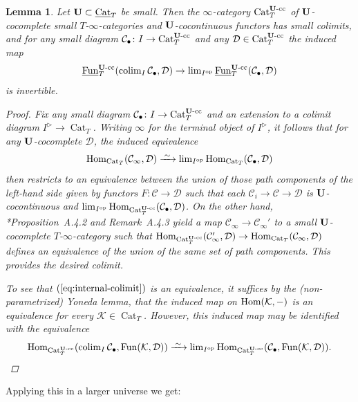 \documentclass[reqno]{memo-l}
\theoremstyle{mythm}
\newtheorem{lemma}[thm]{Lemma}
\theoremstyle{definition}
\numberwithin{equation}{section}
\newcommand{\Cc}{{\mathcal{C}}}
\newcommand{\Dd}{{\mathcal{D}}}
\newcommand{\Kk}{{\mathcal{K}}}
\DeclareMathOperator{\Cat}{Cat}
\renewcommand{\hom}{\textup{hom}}
\newcommand{\Fun}{{\textup{Fun}}}
\newcommand{\cat}[1]{\textbf{\textup{#1}}}
\newcommand{\op}{{\textup{op}}}
\renewcommand{\hom}{{\textup{Hom}}}
\newcommand{\colim}{\mathop{\textup{colim}}}
\newcommand{\ulhelper}[2]{\underline{\setbox0=\hbox{$#1#2$}\dp0=0.4pt \box0\relax}}
\newcommand{\ul}[1]{{\mathpalette\ulhelper{#1}}\hbox{\rule[-2pt]{0pt}{0pt}}}
\newcommand{\iso}{\xrightarrow{\;\smash{\raisebox{-0.25ex}{\ensuremath{\scriptstyle\sim}}}\;}}
\begin{document}
\begin{lemma}\label{lemma:small-class-of-colimits-cc}
    Let $\cat{U}\subset\ul\Cat_T$ be small. Then the $\infty$-category $\Cat_T^\textup{$\cat{U}$-cc}$ of $\cat{U}$-cocomplete small $T$-$\infty$-categories and $\cat{U}$-cocontinuous functors has small colimits, and for any small diagram $\Cc_\bullet\colon I\to\Cat_T^\textup{$\cat{U}$-cc}$ and any $\Dd\in\Cat_T^\textup{$\cat{U}$-cc}$ the induced map
    \begin{equation}\label{eq:internal-colimit}
        \ul\Fun_T^\textup{$\cat{U}$-cc}(\colim\nolimits_I \Cc_\bullet,\Dd)\to\lim\nolimits_{I^\op}\ul\Fun_T^\textup{$\cat{U}$-cc}(\Cc_\bullet,\Dd)
    \end{equation}
    is invertible.
    \begin{proof}
        Fix any small diagram $\Cc_\bullet\colon I\to\Cat_T^\textup{$\cat{U}$-cc}$ and an extension to a colimit diagram $I^\triangleright\to\Cat_T$. Writing $\infty$ for the terminal object of $I^\triangleright$, it follows that for any $\cat{U}$-cocomplete $\Dd$, the induced equivalence
        \[
            \hom_{\Cat_T}(\Cc_\infty,\Dd)\iso\lim\nolimits_{I^\op}\hom_{\Cat_T}(\Cc_\bullet,\Dd)
        \]
        then restricts to an equivalence between the union of those path components of the left-hand side given by functors $F\colon\Cc\to\Dd$ such that each $\Cc_i\to\Cc\to\Dd$ is $\cat{U}$-cocontinuous and $\lim_{I^\op}\hom_{\Cat_T^\textup{$\cat{U}$-cc}}(\Cc_\bullet,\Dd)$. On the other hand, \cite{martiniwolf2022presentable}*{Proposition~A.4.2 and Remark~A.4.3} yield a map $\Cc_\infty\to\Cc_\infty'$ to a small $\cat{U}$-cocomplete $T$-$\infty$-category such that $\hom_{\Cat_T^\textup{$\cat{U}$-cc}}(\Cc_\infty',\Dd)\to\hom_{\Cat_T}(\Cc_\infty,\Dd)$ defines an equivalence of the union of the same set of path components. This provides the desired colimit.
        
        To see that $(\ref{eq:internal-colimit})$ is an equivalence, it suffices by the (non-parametrized) Yoneda lemma, that the induced map on $\hom(\Kk,-)$ is an equivalence for every $\Kk\in\Cat_T$. However, this induced map may be identified with the equivalence
        \[
            \hom_{\Cat_T^\text{$\cat{U}$-cc}}(\colim\nolimits_I\Cc_\bullet,\Fun(\Kk,\Dd))\iso
            \lim\nolimits_{I^\op}\hom_{\Cat_T^\text{$\cat{U}$-cc}}(\Cc_\bullet,\Fun(\Kk,\Dd)).
            \qedhere
        \]        
    \end{proof}
\end{lemma}

Applying this in a larger universe we get:
\end{document}
